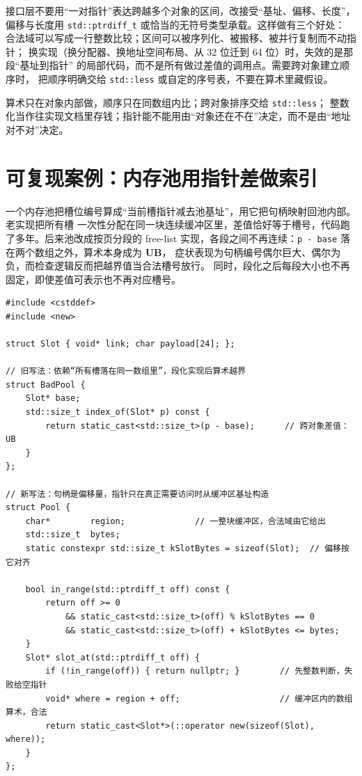 \documentclass[12pt,a4paper,fontset=fandol]{ctexbook}
\newcommand{\Tp}[1]{\texttt{#1}}
\newcommand{\UB}{\textbf{\textsf{UB}}}
\begin{document}
\begin{bestpractice}[title={需要跨对象算术时改用整数偏移量的接口设计}]
接口层不要用“一对指针”表达跨越多个对象的区间，改接受“基址、偏移、长度”，
偏移与长度用 \Tp{std::ptrdiff\_t} 或恰当的无符号类型承载。这样做有三个好处：
合法域可以写成一行整数比较；区间可以被序列化、被搬移、被并行复制而不动指针；
换实现（换分配器、换地址空间布局、从 32 位迁到 64 位）时，失效的是那段“基址到指针”
的局部代码，而不是所有做过差值的调用点。需要跨对象建立顺序时，
把顺序明确交给 \Tp{std::less} 或自定的序号表，不要在算术里藏假设。
\end{bestpractice}

\begin{guideline}[title={指针契约的一句话版本}]
算术只在对象内部做，顺序只在同数组内比；跨对象排序交给 \Tp{std::less}；
整数化当作往实现文档里存钱；指针能不能用由“对象还在不在”决定，而不是由“地址对不对”决定。
\end{guideline}

\section{可复现案例：内存池用指针差做索引}\label{sec:ub05-case}

\begin{casebox}[title={池换实现后，指针差索引整体失效}]
一个内存池把槽位编号算成“当前槽指针减去池基址”，用它把句柄映射回池内部。老实现把所有槽
一次性分配在同一块连续缓冲区里，差值恰好等于槽号，代码跑了多年。后来池改成按页分段的
free-list 实现，各段之间不再连续：\Tp{p - base} 落在两个数组之外，算术本身成为 \UB{}，
症状表现为句柄编号偶尔巨大、偶尔为负，而检查逻辑反而把越界值当合法槽号放行。
同时，段化之后每段大小也不再固定，即使差值可表示也不再对应槽号。
\end{casebox}

\begin{lstlisting}[style=cppstyle, caption={从指针差索引改写为显式基址加偏移}]
#include <cstddef>
#include <new>

struct Slot { void* link; char payload[24]; };

// 旧写法：依赖“所有槽落在同一数组里”，段化实现后算术越界
struct BadPool {
    Slot* base;
    std::size_t index_of(Slot* p) const {
        return static_cast<std::size_t>(p - base);      // 跨对象差值：UB
    }
};

// 新写法：句柄是偏移量，指针只在真正需要访问时从缓冲区基址构造
struct Pool {
    char*        region;              // 一整块缓冲区，合法域由它给出
    std::size_t  bytes;
    static constexpr std::size_t kSlotBytes = sizeof(Slot);  // 偏移按它对齐

    bool in_range(std::ptrdiff_t off) const {
        return off >= 0
            && static_cast<std::size_t>(off) % kSlotBytes == 0
            && static_cast<std::size_t>(off) + kSlotBytes <= bytes;
    }
    Slot* slot_at(std::ptrdiff_t off) {
        if (!in_range(off)) { return nullptr; }        // 先整数判断，失败给空指针
        void* where = region + off;                    // 缓冲区内的数组算术，合法
        return static_cast<Slot*>(::operator new(sizeof(Slot), where));
    }
};
\end{lstlisting}
\end{document}
